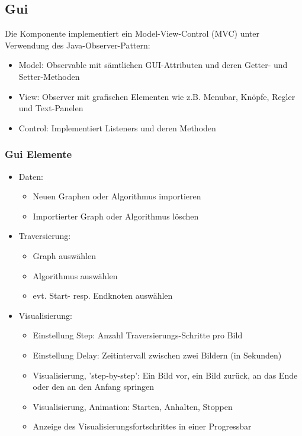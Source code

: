 \subsection{Gui}
\label{subsec:Gui}
Die Komponente implementiert ein Model-View-Control (MVC) unter Verwendung des Java-Observer-Pattern:
\begin{itemize}
  \item Model: Observable mit s\"amtlichen GUI-Attributen und deren Getter- und Setter-Methoden
  \item View: Observer mit grafischen Elementen wie z.B. Menubar, Kn\"opfe, Regler und Text-Panelen
  \item Control: Implementiert Listeners und deren Methoden
\end{itemize}
% 
\subsubsection{Gui Elemente}
\label{subsubsec:Gui Elemente}
\begin{itemize}
  \item Daten:
  \begin{itemize}
    \item Neuen Graphen oder Algorithmus importieren
    \item Importierter Graph oder Algorithmus l\"oschen
  \end{itemize}
  \item Traversierung:
  \begin{itemize}
    \item Graph ausw\"ahlen
    \item Algorithmus ausw\"ahlen
    \item evt. Start- resp. Endknoten ausw\"ahlen
  \end{itemize}
  \item Visualisierung:
  \begin{itemize}
      \item Einstellung Step: Anzahl Traversierungs-Schritte pro Bild
      \item Einstellung Delay: Zeitintervall zwischen zwei Bildern (in Sekunden)      
      \item Visualisierung, 'step-by-step': Ein Bild vor, ein Bild zur\"uck, an das Ende oder den an den Anfang springen
      \item Visualisierung, Animation: Starten, Anhalten, Stoppen
      \item Anzeige des Visualisierungsfortschrittes in einer Progressbar
  \end{itemize}
\end{itemize}